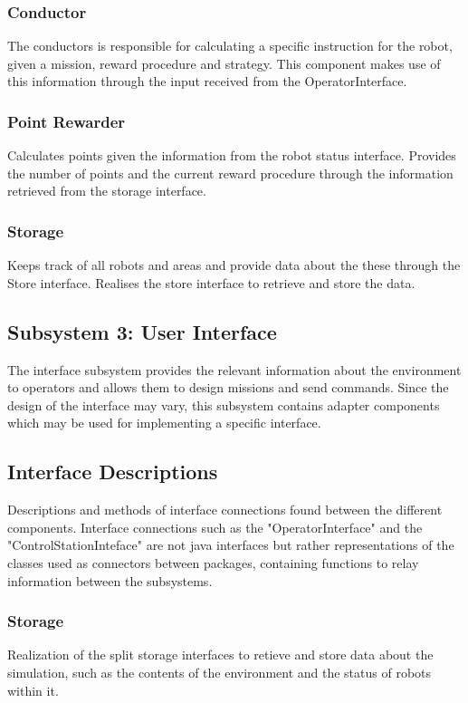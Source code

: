 \subsubsection*{Conductor}
The conductors is responsible for calculating a specific instruction for the robot, given a mission, reward procedure and strategy. This component makes use of this information through the input received from the OperatorInterface.

\subsubsection*{Point Rewarder}
Calculates points given the information from the robot status interface. Provides the number of points and the current reward procedure through the information retrieved from the storage interface.

\subsubsection*{Storage}
Keeps track of all robots and areas and provide data about the these through the Store interface. Realises the store interface to retrieve and store the data.

\subsection*{Subsystem 3: User Interface}
The interface subsystem provides the relevant information about the environment to operators and allows them to design missions and send commands. Since the design of the interface may vary, this subsystem contains adapter components which may be used for implementing a specific interface.

\subsection*{Interface Descriptions}
Descriptions and methods of interface connections found between the different components.
Interface connections such as the "OperatorInterface" and the "ControlStationInteface" are not java interfaces but rather representations of the classes used as connectors between packages, containing functions to relay information between the subsystems.

\subsubsection{Storage}
Realization of the split storage interfaces to retieve and store data about the simulation, such as the contents of the environment and the status of robots within it.

